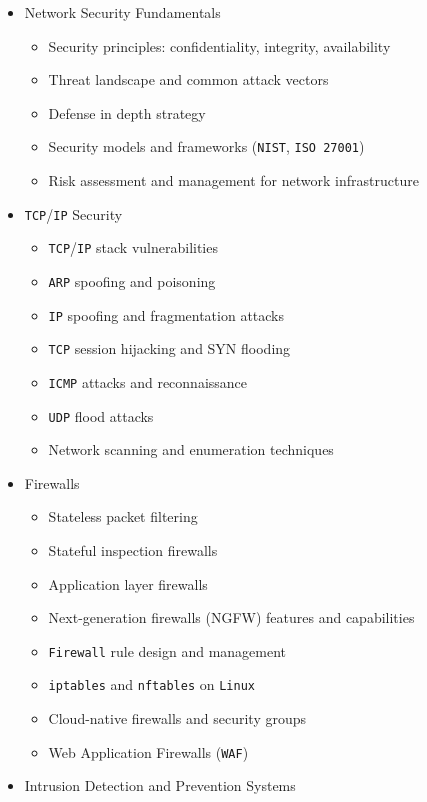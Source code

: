 \documentclass[
]{article}
\providecommand{\tightlist}{%
  \setlength{\itemsep}{0pt}\setlength{\parskip}{0pt}}
\begin{document}
\begin{itemize}
\tightlist
\item
  Network Security Fundamentals

  \begin{itemize}
  \tightlist
  \item
    Security principles: confidentiality, integrity, availability
  \item
    Threat landscape and common attack vectors
  \item
    Defense in depth strategy
  \item
    Security models and frameworks (\texttt{NIST}, \texttt{ISO\ 27001})
  \item
    Risk assessment and management for network infrastructure
  \end{itemize}
\item
  \texttt{TCP}/\texttt{IP} Security

  \begin{itemize}
  \tightlist
  \item
    \texttt{TCP}/\texttt{IP} stack vulnerabilities
  \item
    \texttt{ARP} spoofing and poisoning
  \item
    \texttt{IP} spoofing and fragmentation attacks
  \item
    \texttt{TCP} session hijacking and SYN flooding
  \item
    \texttt{ICMP} attacks and reconnaissance
  \item
    \texttt{UDP} flood attacks
  \item
    Network scanning and enumeration techniques
  \end{itemize}
\item
  Firewalls

  \begin{itemize}
  \tightlist
  \item
    Stateless packet filtering
  \item
    Stateful inspection firewalls
  \item
    Application layer firewalls
  \item
    Next-generation firewalls (NGFW) features and capabilities
  \item
    \texttt{Firewall} rule design and management
  \item
    \texttt{iptables} and \texttt{nftables} on \texttt{Linux}
  \item
    Cloud-native firewalls and security groups
  \item
    Web Application Firewalls (\texttt{WAF})
  \end{itemize}
\item
  Intrusion Detection and Prevention Systems


\end{itemize}
\end{document}
